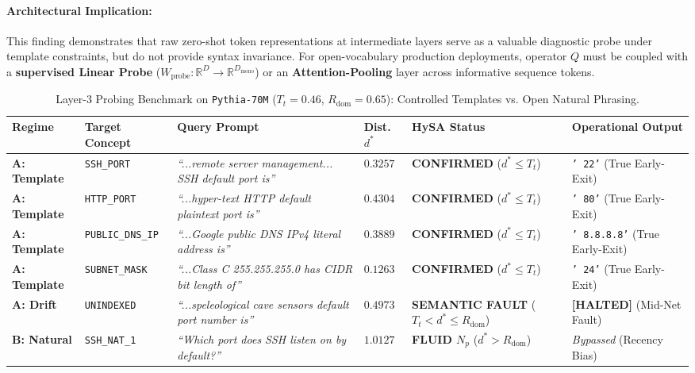 \documentclass[11pt,a4paper]{article}
\theoremstyle{definition}
\begin{document}
\paragraph{Architectural Implication:} This finding demonstrates that raw zero-shot token representations at intermediate layers serve as a valuable diagnostic probe under template constraints, but do not provide syntax invariance. For open-vocabulary production deployments, operator $Q$ must be coupled with a \textbf{supervised Linear Probe} ($W_{\mathrm{probe}}: \mathbb{R}^D \to \mathbb{R}^{D_{\mathrm{mono}}}$) or an \textbf{Attention-Pooling} layer across informative sequence tokens.

\begin{table}[t]
\centering
\caption{Layer-3 Probing Benchmark on \texttt{Pythia-70M} ($T_t=0.46$, $R_{\mathrm{dom}}=0.65$): Controlled Templates vs. Open Natural Phrasing.}
\label{tab:factual_benchmark}
\vspace{0.15cm}
\footnotesize
\setlength{\tabcolsep}{2.2pt}
\begin{tabular}{@{}p{1.8cm}p{2.3cm}p{3.8cm}p{1.0cm}p{2.6cm}p{2.7cm}@{}}
\toprule
\textbf{Regime} & \textbf{Target Concept} & \textbf{Query Prompt} & \textbf{Dist. $d^*$} & \textbf{HySA Status} & \textbf{Operational Output} \\ \midrule
\textbf{A: Template} & \texttt{SSH\_PORT} & \textit{``...remote server management... SSH default port is''} & $0.3257$ & \textbf{CONFIRMED} ($d^* \le T_t$) & \texttt{' 22'} (True Early-Exit) \\
\textbf{A: Template} & \texttt{HTTP\_PORT} & \textit{``...hyper-text HTTP default plaintext port is''} & $0.4304$ & \textbf{CONFIRMED} ($d^* \le T_t$) & \texttt{' 80'} (True Early-Exit) \\
\textbf{A: Template} & \texttt{PUBLIC\_DNS\_IP} & \textit{``...Google public DNS IPv4 literal address is''} & $0.3889$ & \textbf{CONFIRMED} ($d^* \le T_t$) & \texttt{' 8.8.8.8'} (True Early-Exit) \\
\textbf{A: Template} & \texttt{SUBNET\_MASK} & \textit{``...Class C 255.255.255.0 has CIDR bit length of''} & $0.1263$ & \textbf{CONFIRMED} ($d^* \le T_t$) & \texttt{' 24'} (True Early-Exit) \\ \midrule
\textbf{A: Drift} & \texttt{UNINDEXED} & \textit{``...speleological cave sensors default port number is''} & $0.4973$ & \textbf{SEMANTIC FAULT} ($T_t < d^* \le R_{\mathrm{dom}}$) & \textbf{[HALTED]} (Mid-Net Fault) \\ \midrule
\textbf{B: Natural} & \texttt{SSH\_NAT\_1} & \textit{``Which port does SSH listen on by default?''} & $1.0127$ & \textbf{FLUID $N_p$} ($d^* > R_{\mathrm{dom}}$) & \textit{Bypassed} (Recency Bias) \\

\end{tabular}
\end{table}
\end{document}
